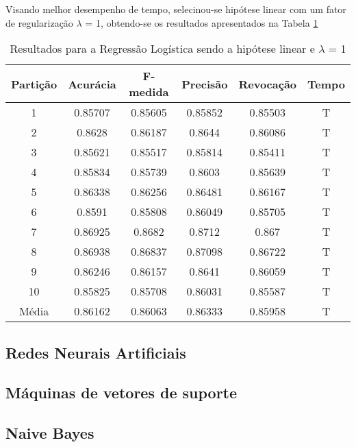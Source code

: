 Visando melhor desempenho de tempo, selecinou-se hipótese linear com um fator de regularização \(\lambda\)  = 1, obtendo-se os resultados apresentados na Tabela \ref{table:resultadosRL}


\begin{table}[h]
\centering
\caption{Resultados para a Regressão Logística sendo a hipótese linear e \(\lambda\) = 1}
\vspace{0.2cm}
\begin{tabular}{c|c|c|c|c|c}
Partição & Acurácia & F-medida & Precisão & Revocação & Tempo \\
\hline
1  & 0.85707 & 0.85605 & 0.85852 & 0.85503 & T \\      
2  & 0.8628  & 0.86187 & 0.8644  & 0.86086 & T \\      
3  & 0.85621 & 0.85517 & 0.85814 & 0.85411 & T \\      
4  & 0.85834 & 0.85739 & 0.8603  & 0.85639 & T \\      
5  & 0.86338 & 0.86256 & 0.86481 & 0.86167 & T \\      
6  & 0.8591  & 0.85808 & 0.86049 & 0.85705 & T \\      
7  & 0.86925 & 0.8682  & 0.8712  & 0.867   & T \\    
8  & 0.86938 & 0.86837 & 0.87098 & 0.86722 & T \\      
9  & 0.86246 & 0.86157 & 0.8641  & 0.86059 & T \\      
10 & 0.85825 & 0.85708 & 0.86031 & 0.85587 & T \\
\hline
Média & 0.86162 & 0.86063 & 0.86333 & 0.85958 & T 

\end{tabular} 
\label{table:resultadosRL}
\end{table}

\subsection{Redes Neurais Artificiais}

\subsection{Máquinas de vetores de suporte}

\subsection{Naive Bayes}

